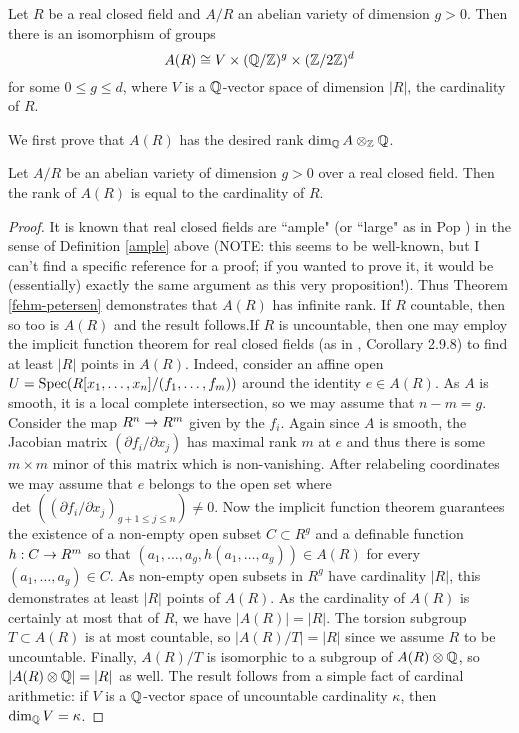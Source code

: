 \begin{theorem}
\label{structure-of-realclosed-AVs}
Let $R$ be a real closed field and $A/R$ an abelian variety of dimension $g>0$. Then there is an isomorphism of groups $$A(R)\cong V \times (\mathbb{Q}/\mathbb{Z})^g\times (\mathbb{Z}/2\mathbb{Z})^d$$ for some $0\leq g \leq d$, where $V$ is a $\mathbb{Q}$-vector space of dimension $|R|$, the cardinality of $R$.
\end{theorem}

We first prove that $A(R)$ has the desired rank $\operatorname{dim}_{\mathbb{Q}}A\otimes_{\mathbb{Z}} \mathbb{Q}$.

\begin{proposition}
\label{prop-freepart}
Let $A/R$ be an abelian variety of dimension $g>0$ over a real closed field. Then the rank of $A(R)$ is equal to the cardinality of $R$.
\end{proposition}
\begin{proof}
It is known that real closed fields are ``ample" (or ``large" as in Pop \cite{pop}) in the sense of Definition \ref{ample} above (NOTE: this seems to be well-known, but I can't find a specific reference for a proof; if you wanted to prove it, it would be (essentially) exactly the same argument as this very proposition!). Thus Theorem \ref{fehm-petersen} demonstrates that $A(R)$ has infinite rank. If $R$ countable, then so too is $A(R)$ and the result follows.\newline \indent If $R$ is uncountable, then one may employ the implicit function theorem for real closed fields (as in \cite{real}, Corollary 2.9.8) to find at least $|R|$ points in $A(R)$. Indeed, consider an affine open $U=\operatorname{Spec}(R[x_1,\dots, x_n]/(f_1,\dots, f_m))$ around the identity $e\in A(R)$. As $A$ is smooth, it is a local complete intersection, so we may assume that $n-m=g$. Consider the map $R^n\rightarrow R^m$ given by the $f_i$. Again since $A$ is smooth, the Jacobian matrix $(\partial f_i / \partial x_j)$ has maximal rank $m$ at $e$ and thus there is some $m\times m$ minor of this matrix which is non-vanishing. After relabeling coordinates we may assume that $e$ belongs to the open set where $\det( (\partial f_i / \partial x_j)_{g+1\leq j\leq n})\neq 0$. Now the implicit function theorem guarantees the existence of a non-empty open subset $C\subset R^g$ and a definable function $h:C\rightarrow R^m$ so that $(a_1,\dots, a_g, h(a_1,\dots, a_g))\in A(R)$ for every $(a_1,\dots, a_g)\in C$. As non-empty open subsets in $R^g$ have cardinality $|R|$, this demonstrates at least $|R|$ points of $A(R)$. As the cardinality of $A(R)$ is certainly at most that of $R$, we have $|A(R)|=|R|$. \newline \indent The torsion subgroup $T\subset A(R)$ is at most countable, so $|A(R)/T|=|R|$ since we assume $R$ to be uncountable. Finally, $A(R)/T$ is isomorphic to a subgroup of $A(R)\otimes \mathbb{Q}$, so $|A(R)\otimes \mathbb{Q}|=|R|$ as well. The result follows from a simple fact of cardinal arithmetic: if $V$ is a $\mathbb{Q}$-vector space of uncountable cardinality $\kappa$, then $\operatorname{dim}_{\mathbb{Q}} V=\kappa$.
\end{proof}

